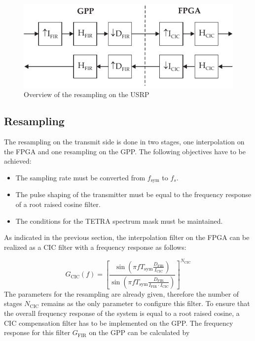 \begin{figure}[htb]
	\centering
		\includegraphics{../kapitel04/figures/tetra_rx_sampling_USRP.pdf}
	\caption{Overview of the resampling on the USRP}
	\label{fig:tetra_rx_sampling_USRP}
\end{figure}


\subsection{Resampling}
The resampling on the transmit side is done in two stages, one interpolation on the FPGA and one resampling on the GPP. The following objectives have to be achieved:

\begin{itemize}
	\item The sampling rate must be converted from $f_\text{sym}$ to $f_s$.
	\item The pulse shaping of the transmitter must be equal to the frequency response of a root raised cosine filter.
	\item The conditions for the TETRA spectrum mask must be maintained.
\end{itemize}

As indicated in the previous section, the interpolation filter on the FPGA can be realized as a \ac{CIC} filter with a frequency response as follows:

\begin{equation}
	G_\text{CIC}(f) = \left[\frac{\sin\left(\pi f T_{\text{sym}} \frac{D_\text{FIR}}{I_\text{CIC}}\right)}{\sin\left(\pi f T_{\text{sym}} \frac{D_\text{FIR}}{I_\text{FIR}\cdot I_\text{CIC}}\right)}\right]^{N_{\text{CIC}}}
	\label{eq:g_cic_f}
\end{equation}
The parameters for the resampling are already given, therefore the number of stages $N_\text{CIC}$ remains as the only parameter to configure this filter. To ensure that the overall frequency response of the system is equal to a root raised cosine, a \ac{CIC} compensation filter has to be implemented on the GPP. The frequency response for this filter $G_{\text{FIR}}$ on the GPP can be calculated by

